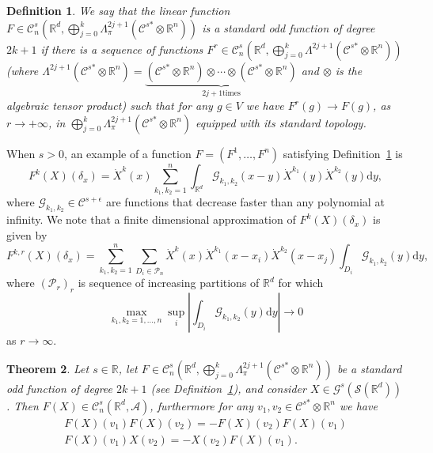 \documentclass{article}
\newcommand{\asterisk}{\mathord{*}}
\newcommand{\mathd}{\mathrm{d}}
\newtheorem{theorem}{Theorem}
\newtheorem{definition}[theorem]{Definition}
\begin{document}
\begin{definition}
  \label{definition-F1}We say that the linear function $F \in \mathcal{C}^s_n
  \left( \mathbb{R}^d, \bigoplus_{j = 0}^k \Lambda^{2 j + 1}_{\pi}
  (\mathcal{C}^{s \asterisk} \otimes \mathbb{R}^n) \right)$ is a standard odd
  function of degree $2 k + 1$ if there is a sequence of functions $F^r \in
  \mathcal{C}^s_n \left( \mathbb{R}^d, \bigoplus_{j = 0}^k \Lambda^{2 j + 1}
  (\mathcal{C}^{s \asterisk} \otimes \mathbb{R}^n) \right)$ (where $\Lambda^{2
  j + 1} (\mathcal{C}^{s \asterisk} \otimes \mathbb{R}^n) =
  \underbrace{(\mathcal{C}^{s \asterisk} \otimes \mathbb{R}^n) \otimes \cdots
  \otimes (\mathcal{C}^{s \asterisk} \otimes \mathbb{R}^n)}_{\text{$2 j + 1$
  times}}$ and $\otimes$ is the algebraic tensor product) such that for any $g
  \in V$ we have $F^r (g) \rightarrow F (g)$, as $r \rightarrow + \infty$, in
  $\bigoplus_{j = 0}^k \Lambda^{2 j + 1}_{\pi} (\mathcal{C}^{s \asterisk}
  \otimes \mathbb{R}^n)$ equipped with its standard topology.
\end{definition}

\begin{remark}
  \label{rem:discr}When $s > 0$, an example of a function $F = (F^1, \ldots,
  F^n)$ satisfying Definition~\ref{definition-F1} is
  \[ F^k (X) (\delta_x) = \dot{X}^k (x) \sum_{k_1, k_2 = 1}^n
     \int_{\mathbb{R}^d} \mathcal{G}_{k_1, k_2} (x - y) \dot{X}^{k_1} (y)
     \dot{X}^{k_2} (y) \mathd y, \]
  where $\mathcal{G}_{k_1, k_2} \in \mathcal{C}^{s + \epsilon}$ are functions
  that decrease faster than any polynomial at infinity. We note that a finite
  dimensional approximation of $F^k (X) (\delta_x)$ is given by
  \[ F^{k, r} (X) (\delta_x) = \sum_{k_1, k_2 = 1}^n \sum_{D_i \in
     \mathcal{P}_n} \dot{X}^k (x) \dot{X}^{k_1} (x - x_i) \dot{X}^{k_2} (x -
     x_j) \int_{D_i} \mathcal{G}_{k_1, k_2} (y) \mathd y, \]
  where $(\mathcal{P}_r)_r$ is sequence of increasing partitions of
  $\mathbb{R}^d$ for which
  \[ \max_{k_1, k_2 = 1, \ldots, n} \sup_i \left| \int_{D_i} \mathcal{G}_{k_1,
     k_2} (y) \mathd y \right| \rightarrow 0 \]
  as $r \rightarrow \infty$.
\end{remark}

\begin{theorem}
  \label{theorem_F}Let $s \in \mathbb{R}$, let $F \in \mathcal{C}^s_n \left(
  \mathbb{R}^d, \bigoplus_{j = 0}^k \Lambda^{2 j + 1}_{\pi} (\mathcal{C}^{s
  \asterisk} \otimes \mathbb{R}^n) \right)$ be a standard odd function of
  degree $2 k + 1$ (see Definition~\ref{definition-F1}), and consider $X \in
  \mathcal{G}^s (\mathcal{S} (\mathbb{R}^d))$. Then $F (X) \in \mathcal{C}^s_n
  (\mathbb{R}^d, \mathcal{A})$, furthermore for any $v_1, v_2 \in
  \mathcal{C}^{s \asterisk} \otimes \mathbb{R}^n$ we have
  \begin{equation}
    \begin{array}{c}
      F (X) (v_1) F (X) (v_2) = - F (X) (v_2) F (X) (v_1)\\
      F (X) (v_1) X (v_2) = - X (v_2) F (X) (v_1) .
    \end{array} \label{eq:anticommutation}
  \end{equation}
\end{theorem}
\end{document}
